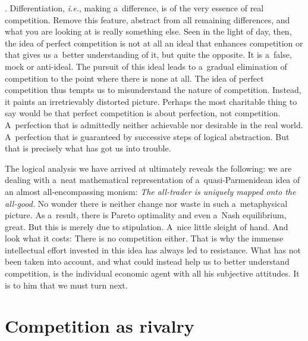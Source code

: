 \parencite[][p.33]{armentano_myths_1972}. %
 Differentiation, \textit{i.e.}, making a~difference, is of the very essence of real competition. Remove this feature, abstract from all remaining differences, and what you are looking at is really something else. Seen in the light of day, then, the idea of perfect competition is not at all an ideal that enhances competition or that gives us a~better understanding of it, but quite the opposite. It is a~false, mock or anti-ideal. The pursuit of this ideal leads to a~gradual elimination of competition to the point where there is none at all. The idea of perfect competition thus tempts us to misunderstand the nature of competition. Instead, it paints an irretrievably distorted picture. Perhaps the most charitable thing to say would be that perfect competition is about perfection, not competition. A~perfection that is admittedly neither achievable nor desirable in the real world. A~perfection that is guaranteed by successive steps of logical abstraction. But that is precisely what has got us into trouble.



The logical analysis we have arrived at ultimately reveals the following: we are dealing with a~neat mathematical representation of a~quasi-Parmenidean idea of an almost all-encompassing monism: \textit{The all-trader is uniquely mapped onto the all-good.} No wonder there is neither change nor waste in such a~metaphysical picture. As a~result, there is Pareto optimality and even a~Nash equilibrium, great. But this is merely due to stipulation. A~nice little sleight of hand. And look what it costs: There is no competition either. That is why the immense intellectual effort invested in this idea has always led to resistance. What has not been taken into account, and what could instead help us to better understand competition, is the individual economic agent with all his subjective attitudes. It is to him that we must turn next.



\section{Competition as rivalry}

